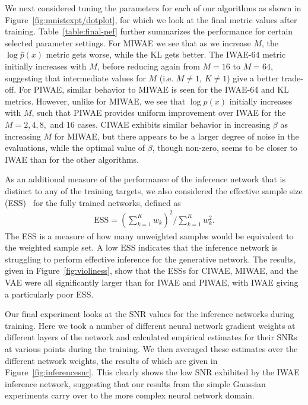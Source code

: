 We next considered tuning the parameters for each of
our algorithms as shown in Figure~\ref{fig:mnistexpt/dotplot}, for
which we look at the final metric values after training.
Table~\ref{table:final-pef} further summarizes the performance
for certain selected parameter settings. For \gls{MIWAE} we see that as we increase $M$, 
the $\log \hat{p}(x)$ metric gets worse, while the \textsc{KL}
gets better.  The \gls{IWAE}-64  metric initially increases with $M$, before reducing
again from $M=16$ to $M=64$, suggesting that intermediate
values for $M$ (i.e. $M\neq1$, $K\neq1$) give a better trade-off.  For \gls{PIWAE}, similar
behavior to \gls{MIWAE} is seen for the \gls{IWAE}-64 
and \textsc{KL} metrics.  However, unlike for \gls{MIWAE}, we see that 
$\log \hat{p}(x)$ initially increases with $M$, such that 
\gls{PIWAE} provides uniform improvement over \gls{IWAE}
for the $M=2,4,8,$ and $16$ cases.  
\gls{CIWAE} exhibits similar behavior in increasing $\beta$
as increasing $M$ for \gls{MIWAE}, but there appears to
be a larger degree of noise in the evaluations, while the optimal
value of $\beta$, though non-zero, seems to be closer
to \gls{IWAE} than for the other algorithms.

As an additional measure of the performance of the inference
network that is distinct to any of the training targets, 
we also considered the effective sample size (ESS)~\cite{Mcbook}
for the fully trained networks, defined as
\begin{align}
\text{ESS} = (\textstyle \sum_{k=1}^K w_k)^2 / \textstyle \sum_{k=1}^K w_k^2.
\end{align}
The ESS is a measure of how many unweighted samples would be equivalent
to the weighted sample set.  
A low $\text{ESS}$ indicates that the inference network is struggling to
perform effective inference for the generative network.
The results, given in Figure~\ref{fig:violiness}, show that the
ESSs for \gls{CIWAE}, \gls{MIWAE}, and the \gls{VAE} were
all significantly larger than for \gls{IWAE} and \gls{PIWAE},
with \gls{IWAE} giving a particularly poor ESS.

Our final experiment looks at the \gls{SNR} values for the 
inference networks during training.  Here we took a number of different neural network gradient weights
at different layers of the network and calculated empirical estimates
for their \gls{SNR}s at various points during the training.  We then
averaged these estimates over the different network weights, the 
results of which are given in Figure~\ref{fig:inferencesnr}.  This
clearly shows the low \gls{SNR} exhibited by the \gls{IWAE}
inference network, suggesting that our results from the simple
Gaussian experiments carry over to the more complex neural network
domain.

